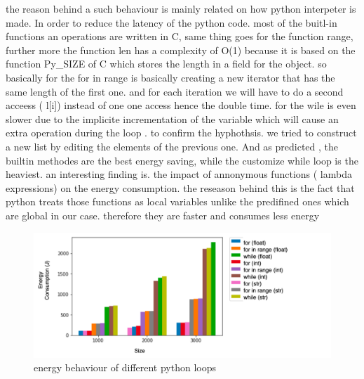 the reason behind a such behaviour is mainly related on how python interpeter is made.
In order to reduce the latency of the python code. most of the buitl-in functions an operations are written in C, same thing goes for the function range, further more the function len has a complexity of O(1) because it is based on the function Py\_SIZE  of C which stores the length in a field for the object.
so basically for the for in range is basically creating a new iterator that has the same length of the first one. and for each iteration we will have to do a second acceess ( l[i]) instead of one one access hence the double time.
for the wile is even slower due to the implicite incrementation of the variable which will cause an extra operation during the loop .
to confirm the hyphothsis. we tried to construct a new list by editing the elements of the previous one. And as predicted , the builtin methodes are the best energy saving, while the customize while loop is the heaviest. an interesting finding is. the impact of annonymous functions ( lambda expressions) on the energy consumption.
the reseason behind this is the fact that python treats those functions as local variables unlike the predifined ones which are global in our case. therefore they are faster and consumes less energy  %

\begin{figure}
    \centering
    \includegraphics[width=\linewidth]{imgs/python_iterations}
    \caption{energy behaviour of different python loops }
    \label{fig:pythonloops}
\end{figure}


